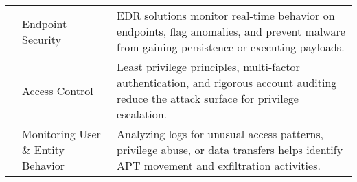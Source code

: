 \begin{table}
\begin{tabular}{l l l}
 & Endpoint Security & EDR solutions monitor real-time behavior on endpoints, flag anomalies, and prevent malware from gaining persistence or executing payloads. \\
 & Access Control & Least privilege principles, multi-factor authentication, and rigorous account auditing reduce the attack surface for privilege escalation. \\
 & Monitoring User \& Entity Behavior & Analyzing logs for unusual access patterns, privilege abuse, or data transfers helps identify APT movement and exfiltration activities. \\ \bottomrule

\end{tabular}

\end{table}














